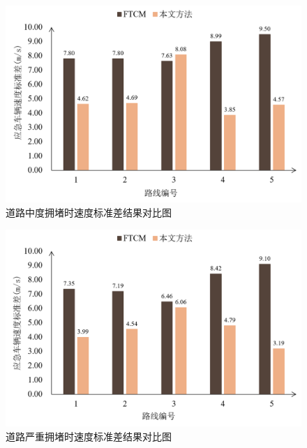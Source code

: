 
\begin{figure}[H]
	\centering
	\includegraphics[width=\linewidth]{figures/std_moderate.png}
	\caption{道路中度拥堵时速度标准差结果对比图}
	\label{fig:std_moderate}
\end{figure}


\begin{figure}[H]
	\centering
	\includegraphics[width=\linewidth]{figures/std_severely.png}
	\caption{道路严重拥堵时速度标准差结果对比图}
	\label{fig:std_severely}
\end{figure}

